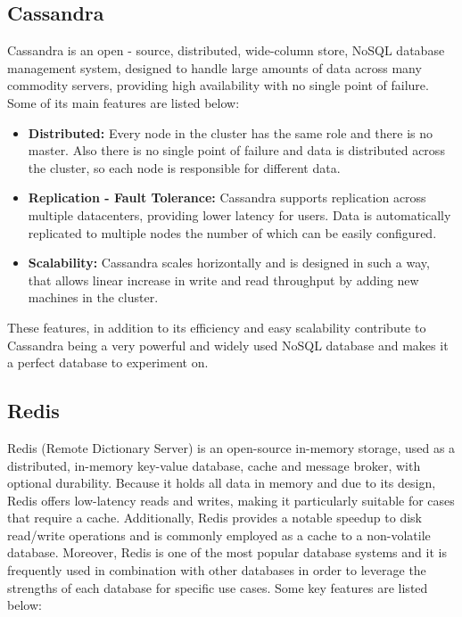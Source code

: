 \documentclass[conference]{IEEEtran}
\begin{document}
\subsection{Cassandra}

Cassandra is an open - source, distributed, wide-column store, NoSQL database management system, designed to handle large amounts of data across many commodity servers,
providing high availability with no single point of failure. Some of its main features are listed below:

\begin{itemize}
    \item \textbf{Distributed:} Every node in the cluster has the same role and there is no master. Also there is no single point of failure and data is distributed across the cluster, so
          each node is responsible for different data.
    \item \textbf{Replication - Fault Tolerance:} Cassandra supports replication across multiple datacenters, providing lower latency for users. Data is automatically replicated to multiple nodes the number
          of which can be easily configured.
    \item \textbf{Scalability:} Cassandra scales horizontally and is designed in such a way, that allows linear increase in write and read throughput by adding new machines in the cluster.
\end{itemize}

These features, in addition to its efficiency and easy scalability contribute to Cassandra being a very powerful and widely used NoSQL database and makes it a perfect database to experiment on.

\subsection{Redis}

Redis (Remote Dictionary Server) is an open-source in-memory storage, used as a distributed, in-memory key-value database, cache and message broker, with optional durability. Because it holds all
data in memory and due to its design, Redis offers low-latency reads and writes, making it particularly suitable for cases that require a cache. Additionally, Redis provides a notable speedup to disk
read/write operations and is commonly employed as a cache to a non-volatile database. Moreover, Redis is one of the most popular database systems and
it is frequently used in combination with other databases in order to leverage the strengths of each database for specific use cases. Some key features are listed below:
\end{document}
